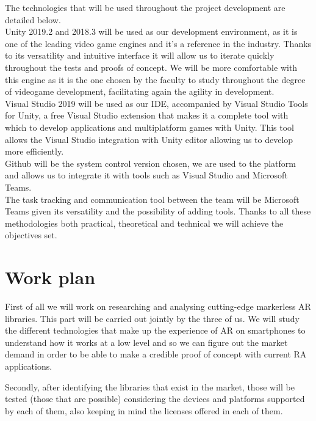 The technologies that will be used throughout the project development are detailed below.\\


Unity 2019.2 and 2018.3 will be used as our development environment, as it is one of the leading video game engines and it’s a reference in the industry. Thanks to its versatility and intuitive interface it will allow us to iterate quickly throughout the tests and proofs of concept. We will be more comfortable with this engine as it is the one chosen by the faculty to study throughout the degree of videogame development, facilitating again the agility in development.\\

Visual Studio 2019 will be used as our IDE, accompanied by Visual Studio Tools for Unity, a free Visual Studio extension that makes it a complete tool with which to develop applications and multiplatform games with Unity. This tool allows the Visual Studio integration with Unity editor allowing us to develop more efficiently.\\

Github will be the system control version chosen, we are used to the platform and allows us to integrate it with tools such as Visual Studio and Microsoft Teams.\\

The task tracking and communication tool between the team will be Microsoft Teams given its versatility and the possibility of adding tools.
Thanks to all these methodologies both practical, theoretical and technical we will achieve the objectives set.\\


\section*{Work plan}
First of all we will work on researching and analysing cutting-edge markerless AR libraries. This part will be carried out jointly by the three of us. We will study the different technologies that make up the experience of AR on smartphones to understand how it works at a low level and so we can figure out the market demand in order to be able to make a credible proof of concept with current RA applications.\vspace{\baselineskip}

Secondly, after identifying the libraries that exist in the market, those will be tested (those that are possible) considering the devices and platforms supported by each of them, also keeping in mind the licenses offered in each of them.


